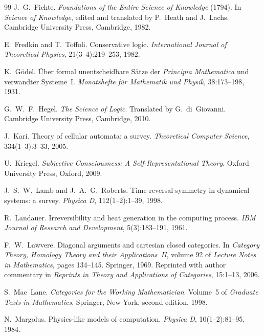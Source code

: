 \documentclass[11pt,a4paper]{article}
\theoremstyle{plain}
\theoremstyle{definition}
\theoremstyle{remark}
\begin{document}
\begin{thebibliography}{99}
J.~G.~Fichte.
\newblock \emph{Foundations of the Entire Science of Knowledge} (1794).
\newblock In \emph{Science of Knowledge}, edited and translated by
  P.~Heath and J.~Lachs. Cambridge University Press, Cambridge, 1982.

E.~Fredkin and T.~Toffoli.
\newblock Conservative logic.
\newblock \emph{International Journal of Theoretical Physics},
  21(3--4):219--253, 1982.

K.~G\"odel.
\newblock \"Uber formal unentscheidbare S\"atze der \emph{Principia
  Mathematica} und verwandter Systeme~I.
\newblock \emph{Monatshefte f\"ur Mathematik und Physik}, 38:173--198,
  1931.

G.~W.~F.~Hegel.
\newblock \emph{The Science of Logic}.
\newblock Translated by G.~di~Giovanni. Cambridge University Press,
  Cambridge, 2010.

J.~Kari.
\newblock Theory of cellular automata: a survey.
\newblock \emph{Theoretical Computer Science}, 334(1--3):3--33, 2005.

U.~Kriegel.
\newblock \emph{Subjective Consciousness: A Self-Representational
  Theory}.
\newblock Oxford University Press, Oxford, 2009.

J.~S.~W.~Lamb and J.~A.~G.~Roberts.
\newblock Time-reversal symmetry in dynamical systems: a survey.
\newblock \emph{Physica D}, 112(1--2):1--39, 1998.

R.~Landauer.
\newblock Irreversibility and heat generation in the computing process.
\newblock \emph{IBM Journal of Research and Development}, 5(3):183--191,
  1961.

F.~W.~Lawvere.
\newblock Diagonal arguments and cartesian closed categories.
\newblock In \emph{Category Theory, Homology Theory and their
  Applications~II}, volume 92 of \emph{Lecture Notes in Mathematics},
  pages 134--145. Springer, 1969.
\newblock Reprinted with author commentary in \emph{Reprints in Theory and
  Applications of Categories}, 15:1--13, 2006.

S.~Mac~Lane.
\newblock \emph{Categories for the Working Mathematician}.
\newblock Volume~5 of \emph{Graduate Texts in Mathematics}. Springer, New
  York, second edition, 1998.

N.~Margolus.
\newblock Physics-like models of computation.
\newblock \emph{Physica D}, 10(1--2):81--95, 1984.


\end{thebibliography}
\end{document}
